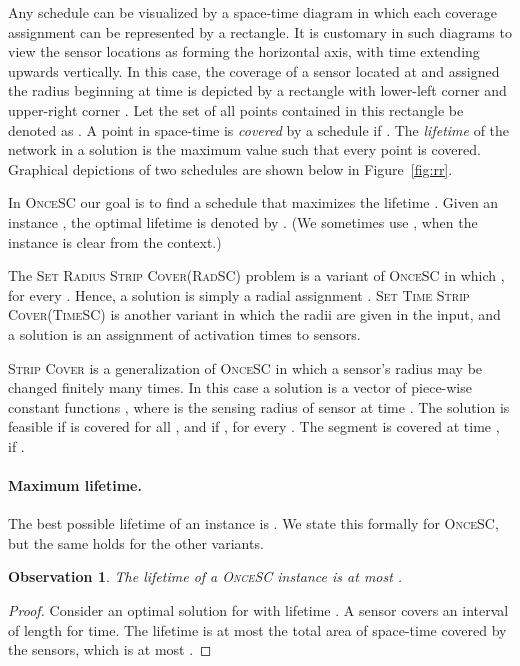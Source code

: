 \documentclass[11pt]{article}
\newtheorem{observation}[lemma]{Observation}
\newcommand{\strip}{\textsc{Strip Cover}\xspace}
\newcommand{\sosc}{\textsc{OnceSC}\xspace}
\newcommand{\srsc}{\textsc{RadSC}\xspace}
\newcommand{\stsc}{\textsc{TimeSC}\xspace}
\newcommand{\srsclong}{\textsc{Set Radius Strip Cover}\xspace}
\newcommand{\stsclong}{\textsc{Set Time Strip Cover}\xspace}
\begin{document}
Any schedule can be visualized by a space-time diagram in which each
coverage assignment can be represented by a rectangle. It is customary
in such diagrams to view the sensor locations as forming the
horizontal axis, with time extending upwards vertically. In this case,
the coverage of a sensor located at  and assigned the radius
 beginning at time  is depicted by a rectangle with
lower-left corner  and upper-right corner
. Let the set of all points
contained in this rectangle be denoted as .
A point  in space-time is \emph{covered} by a schedule  if . The
\emph{lifetime} of the network in a solution  is the
maximum value  such that every point  is
covered. Graphical depictions of two schedules are shown below in
Figure~\ref{fig:rr}.

In \sosc our goal is to find a schedule  that maximizes
the lifetime . Given an instance , the optimal lifetime
is denoted by .  (We sometimes use , when the
instance is clear from the context.)

The \srsclong (\srsc) problem is a variant of \sosc in which
, for every .  Hence, a solution is simply a radial
assignment .  \stsclong (\stsc) is another variant in which the
radii are given in the input, and a solution is an assignment of
activation times to sensors.


\strip is a generalization of \sosc in which a sensor's radius may be 
changed finitely many times.  In this case a solution is a vector of
piece-wise constant functions , where  is the
sensing radius of sensor  at time . The solution is feasible if
 is covered for all , and if , for every .
The segment  is covered at time , if 
.



\paragraph*{\bf Maximum lifetime.}
The best possible lifetime of an instance  is .
We state this formally for \sosc, but the same holds for the other
variants.


\begin{observation}
\label{obs:lifetime}
The lifetime of a
\sosc instance  is at most .
\end{observation}
\begin{proof}
Consider an optimal solution  for  with lifetime
.  A sensor  covers an interval of length  for
 time.  The lifetime 
is at most the total area of space-time covered by the sensors, which
is at most .
\end{proof}
\end{document}
